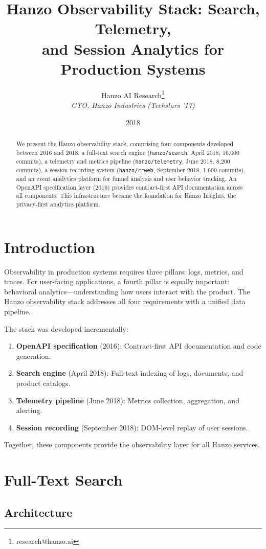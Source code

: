 \documentclass[11pt,a4paper]{article}
\title{Hanzo Observability Stack: Search, Telemetry,\\and Session Analytics for Production Systems}
\author{Hanzo AI Research\thanks{research@hanzo.ai} \\ \textit{CTO, Hanzo Industries (Techstars '17)}}
\date{2018}
\begin{document}
\hanzocoverpage

\begin{abstract}
We present the Hanzo observability stack, comprising four components developed between 2016 and 2018: a full-text search engine (\texttt{hanzo/search}, April 2018, 16{,}000 commits), a telemetry and metrics pipeline (\texttt{hanzo/telemetry}, June 2018, 8{,}200 commits), a session recording system (\texttt{hanzo/rrweb}, September 2018, 1{,}600 commits), and an event analytics platform for funnel analysis and user behavior tracking. An OpenAPI specification layer (2016) provides contract-first API documentation across all components. This infrastructure became the foundation for Hanzo Insights, the privacy-first analytics platform.
\end{abstract}

\section{Introduction}

Observability in production systems requires three pillars: logs, metrics, and traces. For user-facing applications, a fourth pillar is equally important: behavioral analytics---understanding how users interact with the product. The Hanzo observability stack addresses all four requirements with a unified data pipeline.

The stack was developed incrementally:
\begin{enumerate}
    \item \textbf{OpenAPI specification} (2016): Contract-first API documentation and code generation.
    \item \textbf{Search engine} (April 2018): Full-text indexing of logs, documents, and product catalogs.
    \item \textbf{Telemetry pipeline} (June 2018): Metrics collection, aggregation, and alerting.
    \item \textbf{Session recording} (September 2018): DOM-level replay of user sessions.
\end{enumerate}

Together, these components provide the observability layer for all Hanzo services.

\section{Full-Text Search}

\subsection{Architecture}
\end{document}
